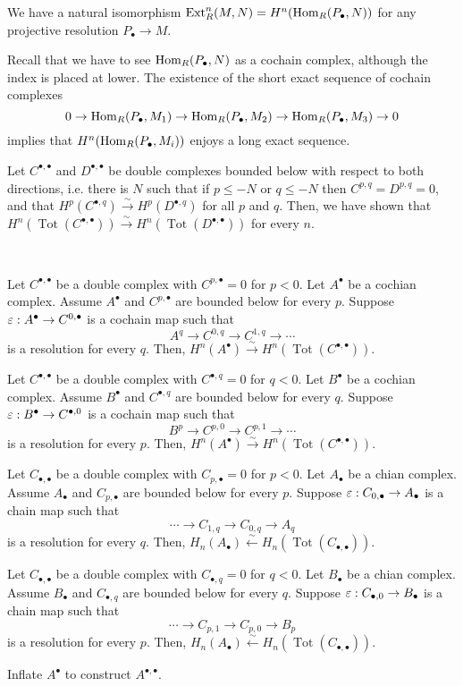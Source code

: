\documentclass{../../small}
\DeclareMathOperator{\Tot}{Tot}
\begin{document}
\begin{thm*}[2.4.5]
We have a natural isomorphism $\operatorname{Ext}_R^n(M,N)=H^n(\operatorname{Hom}_R(P_\bullet,N))$ for any projective resolution $P_\bullet\to M$.
\end{thm*}

Recall that we have to see $\operatorname{Hom}_R(P_\bullet,N)$ as a cochain complex, although the index is placed at lower.
The existence of the short exact sequence of cochain complexes
\[0\to\operatorname{Hom}_R(P_\bullet,M_1)\to\operatorname{Hom}_R(P_\bullet,M_2)\to\operatorname{Hom}_R(P_\bullet,M_3)\to0\]
implies that $H^n(\operatorname{Hom}_R(P_\bullet,M_i))$ enjoys a long exact sequence.

Let $C^{\bullet,\bullet}$ and $D^{\bullet,\bullet}$ be double complexes bounded below with respect to both directions, i.e. there is $N$ such that if $p\le-N$ or $q\le-N$ then $C^{p,q}=D^{p,q}=0$, and that $H^p(C^{\bullet,q})\xrightarrow{\sim}H^p(D^{\bullet,q})$ for all $p$ and $q$.
Then, we have shown that $H^n(\Tot(C^{\bullet,\bullet}))\xrightarrow{\sim}H^n(\Tot(D^{\bullet,\bullet}))$ for every $n$.

\begin{prop*}\,
\begin{parts}
\item
Let $C^{\bullet,\bullet}$ be a double complex with $C^{p,\bullet}=0$ for $p<0$.
Let $A^\bullet$ be a cochian complex.
Assume $A^\bullet$ and $C^{p,\bullet}$ are bounded below for every $p$.
Suppose $\varepsilon:A^\bullet\to C^{0,\bullet}$ is a cochain map such that
\[A^q\to C^{0,q}\to C^{1,q}\to\cdots\]
is a resolution for every $q$.
Then, $H^n(A^\bullet)\xrightarrow{\sim} H^n(\Tot(C^{\bullet,\bullet}))$.
\item
Let $C^{\bullet,\bullet}$ be a double complex with $C^{\bullet,q}=0$ for $q<0$.
Let $B^\bullet$ be a cochian complex.
Assume $B^\bullet$ and $C^{\bullet,q}$ are bounded below for every $q$.
Suppose $\varepsilon:B^\bullet\to C^{\bullet,0}$ is a cochain map such that
\[B^p\to C^{p,0}\to C^{p,1}\to\cdots\]
is a resolution for every $p$.
Then, $H^n(A^\bullet)\xrightarrow{\sim} H^n(\Tot(C^{\bullet,\bullet}))$.
\item
Let $C_{\bullet,\bullet}$ be a double complex with $C_{p,\bullet}=0$ for $p<0$.
Let $A_\bullet$ be a chian complex.
Assume $A_\bullet$ and $C_{p,\bullet}$ are bounded below for every $p$.
Suppose $\varepsilon:C_{0,\bullet}\to A_\bullet$ is a chain map such that
\[\cdots\to C_{1,q}\to C_{0,q}\to A_q\]
is a resolution for every $q$.
Then, $H_n(A_\bullet)\xleftarrow{\sim} H_n(\Tot(C_{\bullet,\bullet}))$.
\item
Let $C_{\bullet,\bullet}$ be a double complex with $C_{\bullet,q}=0$ for $q<0$.
Let $B_\bullet$ be a chian complex.
Assume $B_\bullet$ and $C_{\bullet,q}$ are bounded below for every $q$.
Suppose $\varepsilon:C_{\bullet,0}\to B_\bullet$ is a chain map such that
\[\cdots\to C_{p,1}\to C_{p,0}\to B_p\]
is a resolution for every $p$.
Then, $H_n(A_\bullet)\xleftarrow{\sim} H_n(\Tot(C_{\bullet,\bullet}))$.
\end{parts}
\end{prop*}
\begin{pf}
Inflate $A^\bullet$ to construct $A^{\bullet,\bullet}$.
\end{pf}
\end{document}
